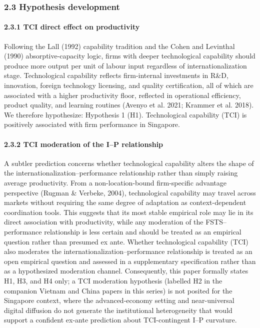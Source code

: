 \documentclass[12pt,a4paper]{article}
\begin{document}
\hypertarget{23-hypothesis-development}{%
\subsubsection{2.3 Hypothesis
development}\label{23-hypothesis-development}}

\hypertarget{231-tci-direct-effect-on-productivity}{%
\paragraph{2.3.1 TCI direct effect on
productivity}\label{231-tci-direct-effect-on-productivity}}

Following the Lall (1992) capability tradition and the Cohen and
Levinthal (1990) absorptive-capacity logic, firms with deeper
technological capability should produce more output per unit of labour
input regardless of internationalization stage. Technological capability
reflects firm-internal investments in R\&D, innovation, foreign
technology licensing, and quality certification, all of which are
associated with a higher productivity floor, reflected in operational
efficiency, product quality, and learning routines (Avenyo et al. 2021;
Krammer et al. 2018). We therefore hypothesize: Hypothesis 1 (H1).
Technological capability (TCI) is positively associated with firm
performance in Singapore.

\hypertarget{232-tci-moderation-of-the-ip-relationship}{%
\paragraph{2.3.2 TCI moderation of the I--P
relationship}\label{232-tci-moderation-of-the-ip-relationship}}

A subtler prediction concerns whether technological capability alters
the shape of the internationalization--performance relationship rather
than simply raising average productivity. From a non-location-bound
firm-specific advantage perspective (Rugman \& Verbeke, 2004),
technological capability may travel across markets without requiring the
same degree of adaptation as context-dependent coordination tools. This
suggests that its most stable empirical role may lie in its direct
association with productivity, while any moderation of the
FSTS--performance relationship is less certain and should be treated as
an empirical question rather than presumed ex ante. Whether
technological capability (TCI) also moderates the
internationalization--performance relationship is treated as an open
empirical question and assessed in a supplementary specification rather
than as a hypothesized moderation channel. Consequently, this paper
formally states H1, H3, and H4 only; a TCI moderation hypothesis
(labelled H2 in the companion Vietnam and China papers in this series)
is not posited for the Singapore context, where the advanced-economy
setting and near-universal digital diffusion do not generate the
institutional heterogeneity that would support a confident ex-ante
prediction about TCI-contingent I--P curvature.
\end{document}
